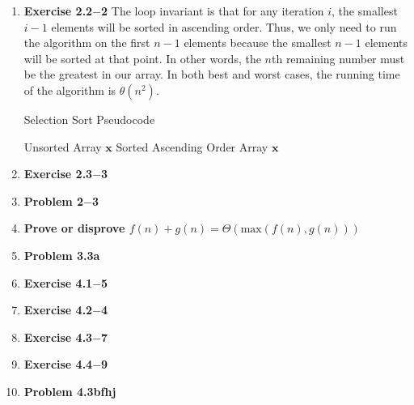 \documentclass[a4paper,11pt,oneside]{book}
\begin{document}
\noindent{}
\normalsize

\begin{enumerate}
  \item {\textbf{Exercise 2.2$-$2}} The loop invariant is that for any iteration $i$, the smallest $i-1$ elements
  will be sorted in ascending order. Thus, we only need to run the algorithm on the first $n-1$
  elements because the smallest $n-1$ elements will be sorted at that point. In other words, the $n$th 
  remaining number must be the greatest in our array. In both best and worst cases, the running time of the
  algorithm is $\theta(n^2)$.
\begin{algorithm}
    \caption{Selection Sort Pseudocode}
    \begin{algorithmic}[1]
        \Require Unsorted Array $\mathbf{x}$
        \Ensure Sorted Ascending Order Array $\mathbf{x}$
        \Statex
            \EndIf
          \EndFor
        \EndFor
        \State {}
        \EndFunction
    \end{algorithmic}
\end{algorithm}

  \item {\textbf{Exercise 2.3$-$3}}
  \item {\textbf{Problem 2$-$3}}
  \item {\textbf{Prove or disprove $f(n) + g(n) = \Theta(\text{max}(f(n), g(n)))$}}
  \item {\textbf{Problem 3.3a}}
  \item {\textbf{Exercise 4.1$-$5}}
  \item {\textbf{Exercise 4.2$-$4}}
  \item {\textbf{Exercise 4.3$-$7}}
  \item {\textbf{Exercise 4.4$-$9}}
  \item {\textbf{Problem 4.3bfhj}}
  
\end{enumerate}
\end{document}
